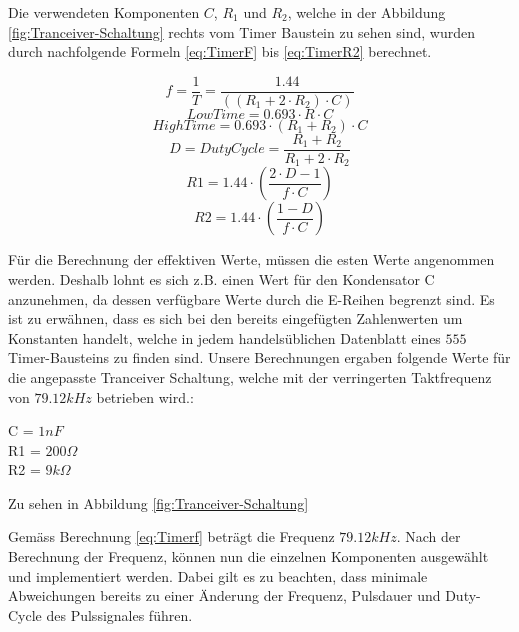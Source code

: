 Die verwendeten Komponenten $C$, $R_{1}$ und $R_{2}$, welche in der Abbildung  \ref{fig:Tranceiver-Schaltung} rechts vom Timer Baustein zu sehen sind, wurden durch nachfolgende Formeln \ref{eq:TimerF} bis \ref{eq:TimerR2} berechnet. 


\begin{equation}\label{eq:Timerf}
f= \dfrac{1}{T}= \dfrac{1.44}{((R_{1} + 2 \cdot R_{2})\cdot C)}
\end{equation}
\begin{equation}\label{eq:TimerTL}
LowTime= 0.693 \cdot R \cdot C
\end{equation}
\begin{equation}\label{eq:TimerTH}
HighTime= 0.693 \cdot (R_{1} + R_{2}) \cdot C
\end{equation}
\begin{equation}\label{eq:TimerDC}
D = DutyCycle = \dfrac{R_{1} + R_{2}}{R_{1} + 2 \cdot R_{2}}
\end{equation}
\begin{equation}\label{eq:TimerR1}
R1 = 1.44 \cdot \left( \dfrac{2 \cdot D - 1}{f \cdot C} \right)
\end{equation}
\begin{equation}\label{eq:TimerR2}
R2 = 1.44 \cdot \left( \dfrac{1-D}{f \cdot C} \right)
\end{equation} 


Für die Berechnung der effektiven Werte, müssen die esten Werte angenommen werden. Deshalb lohnt es sich z.B. einen Wert für den Kondensator C anzunehmen, da dessen verfügbare Werte  durch die E-Reihen begrenzt sind. Es ist zu erwähnen, dass es sich bei den bereits eingefügten Zahlenwerten um Konstanten handelt, welche in jedem handelsüblichen Datenblatt eines $555$ Timer-Bausteins zu finden sind. Unsere Berechnungen ergaben folgende Werte für die angepasste Tranceiver Schaltung, welche mit der verringerten Taktfrequenz von $79.12 kHz$ betrieben wird.:

\begin{center}
C = $1nF$\\
R1 = $200\Omega$\\
R2 = $9k\Omega$\\
\end{center}

Zu sehen in Abbildung \ref{fig:Tranceiver-Schaltung} 

 
Gemäss Berechnung \ref{eq:Timerf} beträgt die Frequenz $79.12kHz$. Nach der Berechnung der Frequenz, können nun die einzelnen Komponenten ausgewählt und implementiert werden. Dabei gilt es zu beachten, dass minimale Abweichungen bereits zu einer Änderung der Frequenz, Pulsdauer und Duty-Cycle des Pulssignales führen.


